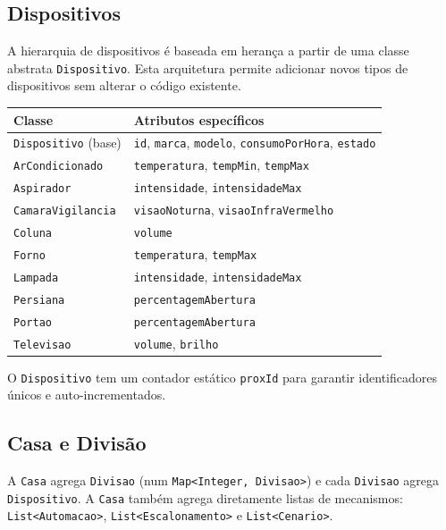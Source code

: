 \documentclass[a4paper]{article}
\begin{document}
\subsection{Dispositivos}

A hierarquia de dispositivos é baseada em herança a partir de uma classe abstrata \texttt{Dispositivo}. Esta arquitetura permite adicionar novos tipos de dispositivos sem alterar o código existente.

\begin{center}
\begin{tabular}{ll}
    \toprule
    \textbf{Classe} & \textbf{Atributos específicos} \\
    \midrule
    \texttt{Dispositivo} (base) & \texttt{id}, \texttt{marca}, \texttt{modelo}, \texttt{consumoPorHora}, \texttt{estado} \\
    \texttt{ArCondicionado} & \texttt{temperatura}, \texttt{tempMin}, \texttt{tempMax} \\
    \texttt{Aspirador} & \texttt{intensidade}, \texttt{intensidadeMax} \\
    \texttt{CamaraVigilancia} & \texttt{visaoNoturna}, \texttt{visaoInfraVermelho} \\
    \texttt{Coluna} & \texttt{volume} \\
    \texttt{Forno} & \texttt{temperatura}, \texttt{tempMax} \\
    \texttt{Lampada} & \texttt{intensidade}, \texttt{intensidadeMax} \\
    \texttt{Persiana} & \texttt{percentagemAbertura} \\
    \texttt{Portao} & \texttt{percentagemAbertura} \\
    \texttt{Televisao} & \texttt{volume}, \texttt{brilho} \\
    \bottomrule
\end{tabular}
\end{center}

O \texttt{Dispositivo} tem um contador estático \texttt{proxId} para garantir identificadores únicos e auto-incrementados.

\subsection{Casa e Divisão}

A \texttt{Casa} agrega \texttt{Divisao} (num \texttt{Map<Integer, Divisao>}) e cada \texttt{Divisao} agrega \texttt{Dispositivo}. A \texttt{Casa} também agrega diretamente listas de mecanismos: \texttt{List<Automacao>}, \texttt{List<Escalonamento>} e \texttt{List<Cenario>}.
\end{document}
